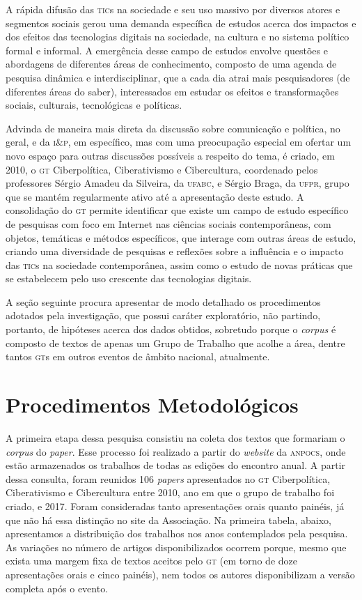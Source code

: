 A rápida difusão das \textsc{tic}s na sociedade e seu uso massivo por diversos
atores e segmentos sociais gerou uma demanda específica de estudos
acerca dos impactos e dos efeitos das tecnologias digitais na sociedade,
na cultura e no sistema político formal e informal. A emergência desse
campo de estudos envolve questões e abordagens de diferentes áreas de
conhecimento, composto de uma agenda de pesquisa dinâmica e
interdisciplinar, que a cada dia atrai mais pesquisadores (de diferentes
áreas do saber), interessados em estudar os efeitos e transformações
sociais, culturais, tecnológicas e políticas.

Advinda de maneira mais direta da discussão sobre comunicação e
política, no geral, e da \textsc{i\&p}, em específico, mas com uma
preocupação especial em ofertar um novo espaço para outras discussões
possíveis a respeito do tema, é criado, em 2010, o \textsc{gt} Ciberpolítica,
Ciberativismo e Cibercultura, coordenado pelos professores Sérgio
Amadeu da Silveira, da \textsc{ufabc}, e Sérgio Braga, da \textsc{ufpr}, grupo que se
mantém regularmente ativo até a apresentação deste estudo. A
consolidação do \textsc{gt} permite identificar que existe um campo de estudo
específico de pesquisas com foco em Internet nas ciências sociais
contemporâneas, com objetos, temáticas e métodos específicos, que
interage com outras áreas de estudo, criando uma diversidade de
pesquisas e reflexões sobre a influência e o impacto das \textsc{tic}s na
sociedade contemporânea, assim como o estudo de novas práticas que se
estabelecem pelo uso crescente das tecnologias digitais.

A seção seguinte procura apresentar de modo detalhado os procedimentos
adotados pela investigação, que possui caráter exploratório, não
partindo, portanto, de hipóteses acerca dos dados obtidos, sobretudo
porque o \textit{corpus} é composto de textos de apenas um Grupo de
Trabalho que acolhe a área, dentre tantos \textsc{gt}s em outros eventos de
âmbito nacional, atualmente.

\section{Procedimentos Metodológicos}

A primeira etapa dessa pesquisa consistiu na coleta dos textos que
formariam o \textit{corpus} do \textit{paper}. Esse processo foi realizado a
partir do \textit{website} da \textsc{anpocs}, onde estão armazenados os trabalhos de todas as edições do encontro
anual. A partir dessa consulta, foram reunidos 106
\textit{papers} apresentados no \textsc{gt} Ciberpolítica, Ciberativismo e
Cibercultura entre 2010, ano em que o grupo de trabalho foi criado, e
2017. Foram consideradas tanto apresentações orais quanto painéis, já
que não há essa distinção no site da Associação. Na primeira tabela, abaixo,
apresentamos a distribuição dos trabalhos nos anos contemplados pela
pesquisa. As variações no número de artigos disponibilizados ocorrem
porque, mesmo que exista uma margem fixa de textos aceitos pelo \textsc{gt} (em
torno de doze apresentações orais e cinco painéis), nem todos os
autores disponibilizam a versão completa após o evento.
\enlargethispage{\baselineskip}


